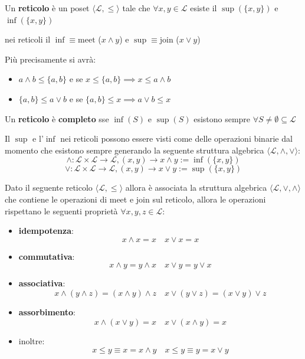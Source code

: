 \begin{definizione}
    Un \textbf{reticolo} è un poset $\langle \mathcal{L}, \le \rangle$ tale che 
    $\forall x,y\in\mathcal{L}$ esiste il $\sup(\{x,y\})$ e $\inf(\{x,y\})$
\end{definizione}
nei reticoli il $\inf \equiv \text{meet}$ ($x\land y$) e  $\sup \equiv \text{join}$ ($x\lor y$)

Più precisamente si avrà:
\begin{itemize}
    \item $a\land b \le \{a,b\}$ e se $x\le  \{a,b\}\implies x\le a\land b$
    \item $\{a,b\} \le a\lor b$ e se $\{a,b\}\le x \implies a\lor b \le x$
\end{itemize}
\begin{definizione}
    Un \textbf{reticolo} è \textbf{completo} sse $\inf(S)$ e $\sup(S)$ esistono 
    sempre $\forall S \ne \emptyset \subseteq\mathcal{L}$
\end{definizione}

Il $\sup$ e l'$\inf$ nei reticoli possono essere visti come delle operazioni binarie
dal momento che esistono sempre generando la seguente struttura algebrica $\langle \mathcal{L}, \land,\lor \rangle$:
$$\land : \mathcal{L} \times \mathcal{L} \to \mathcal{L}, (x,y) \to x\land y :=\inf(\{x,y\})$$
$$\lor : \mathcal{L} \times \mathcal{L} \to \mathcal{L}, (x,y) \to x\lor y :=\sup(\{x,y\})$$


\begin{teorema}
    Dato il seguente reticolo $\langle \mathcal{L}, \le \rangle$ allora è associata 
    la struttura algebrica $\langle \mathcal{L}, \lor, \land\rangle$ che contiene le 
    operazioni di meet e join sul reticolo, allora le operazioni rispettano 
    le seguenti proprietà $\forall x,y,z\in \mathcal{L}$:
    \begin{itemize}
        \item \textbf{idempotenza}:
        $$x\land x = x \quad x\lor x = x$$ 
        \item \textbf{commutativa}:
        $$x\land y = y\land x \quad x\lor y = y\lor x$$ 
        \item \textbf{associativa}:
        $$x\land (y \land z) = (x \land y)\land z \quad x\lor (y \lor z) =( x\lor y)\lor z$$ 
        \item \textbf{assorbimento}:
        $$x\land (x \lor y) =x\quad x\lor (x \land y) =x$$  
        \item inoltre:
        $$x\le y \equiv x=x\land y\quad x\le y \equiv y=x\lor y$$ 
    \end{itemize} 
\end{teorema}

